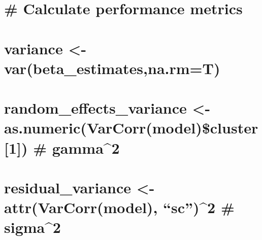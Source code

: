 \documentclass[
]{article}
\begin{document}
\hypertarget{section-17}{%
\section{}\label{section-17}}

\hypertarget{section-18}{%
\section{}\label{section-18}}

\hypertarget{section-19}{%
\section{}\label{section-19}}

\hypertarget{calculate-performance-metrics}{%
\section{\# Calculate performance
metrics}\label{calculate-performance-metrics}}

\hypertarget{section-20}{%
\section{}\label{section-20}}

\hypertarget{variance---varbeta_estimatesna.rmt}{%
\section{variance \textless-
var(beta\_estimates,na.rm=T)}\label{variance---varbeta_estimatesna.rmt}}

\hypertarget{random_effects_variance---as.numericvarcorrmodelcluster1-gamma2}{%
\section{random\_effects\_variance \textless-
as.numeric(VarCorr(model)\$cluster{[}1{]}) \#
gamma\^{}2}\label{random_effects_variance---as.numericvarcorrmodelcluster1-gamma2}}

\hypertarget{residual_variance---attrvarcorrmodel-sc2-sigma2}{%
\section{residual\_variance \textless- attr(VarCorr(model), ``sc'')\^{}2
\# sigma\^{}2}\label{residual_variance---attrvarcorrmodel-sc2-sigma2}}

\hypertarget{section-21}{%
\section{}\label{section-21}}
\end{document}
